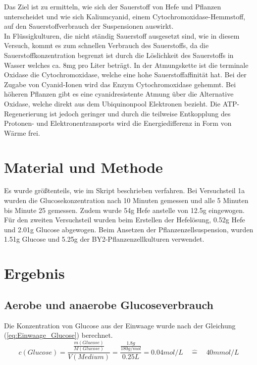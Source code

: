 \documentclass[10pt,a4paper]{article}
\begin{document}
		Das Ziel ist zu ermitteln, wie sich der Sauerstoff von Hefe und Pflanzen unterscheidet und wie sich Kaliumcyanid, einem Cytochromoxidase-Hemmstoff, auf den Sauerstoffverbrauch der Suspensionen auswirkt.\\
		 In Flüssigkulturen, die nicht ständig Sauerstoff ausgesetzt sind, wie in diesem Versuch, kommt es zum schnellen Verbrauch des Sauerstoffs, da die Sauerstoffkonzentration begrenzt ist durch die Löslichkeit des Sauerstoffs in Wasser welches ca. 8mg pro Liter beträgt. In der Atmungskette ist die terminale Oxidase die Cytochromoxidase, welche eine hohe Sauerstoffaffinität hat. Bei der Zugabe von Cyanid-Ionen wird das Enzym Cytochromoxidase gehemmt. Bei höheren Pflanzen gibt es eine cyanidresistente Atmung über die Alternative Oxidase, welche direkt aus dem Ubiquinonpool Elektronen bezieht. Die ATP-Regenerierung ist jedoch geringer und durch die teilweise Entkopplung des Protonen- und Elektronentransports wird die Energiedifferenz in Form von Wärme frei.\\
		 

	
	\section{Material und Methode}
	
	
	Es wurde größtenteils, wie im Skript beschrieben verfahren. Bei Versuchsteil 1a wurden die Glucosekonzentration nach 10 Minuten gemessen und alle 5 Minuten bis Minute 25 gemessen. Zudem wurde 54g Hefe anstelle von 12.5g eingewogen.\\
	Für den zweiten Versuchsteil wurden beim Erstellen der Hefelösung, 0.52g Hefe und 2.01g Glucose abgewogen. Beim Ansetzen der Pflanzenzellsuspension, wurden 1.51g Glucose und 5.25g der BY2-Pflanzenzellkulturen verwendet.
	
	\section{Ergebnis}
		\subsection{Aerobe und anaerobe Glucoseverbrauch}
			Die Konzentration von Glucose aus der Einwaage wurde nach der Gleichung (\ref{eq:Einwaage_Glucose}) berechnet.\\
			
			\begin{equation}\label{eq:Einwaage_Glucose}
				c(Glucose) = \frac{\frac{m(Glucose)}{M(Glucose)}}{V(Medium)} = \frac{\frac{1.8 g}{180 g/mol}}{0.25L} = 0.04 mol/L \quad\widehat{=} \quad 40 mmol/L
			\end{equation}
			
\end{document}
